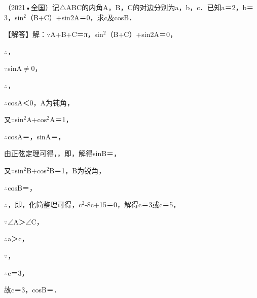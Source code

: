 \begin{question}
（2021•全国）记$\triangle$ABC的内角A，B，C的对边分别为a，b，c．已知a＝2\allowbreak{}，b＝3，sin$^{2}$（B+C）+\allowbreak{}sin2A＝0，求c及cosB．\par
\begin{solution}
【解答】解：$\because$A+B+C＝π，sin$^{2}$（B+C）+\allowbreak{}sin2A＝0，\par
$\therefore$\allowbreak{}，\par
$\because$sinA$\neq$0，\par
$\therefore$\allowbreak{}，\par
$\therefore$cosA＜0，A为钝角，\par
又$\because$sin$^{2}$A+cos$^{2}$A＝1，\par
$\therefore$cosA＝\allowbreak{}，sinA＝\allowbreak{}，\par
由正弦定理可得，\allowbreak{}，即\allowbreak{}，解得sinB＝\allowbreak{}，\par
又$\because$sin$^{2}$B+cos$^{2}$B＝1，B为锐角，\par
$\therefore$cosB＝\allowbreak{}，\par
$\therefore$\allowbreak{}，即\allowbreak{}，化简整理可得，c$^{2}$-8c+15＝0，解得c＝3或c＝5，\par
$\because$$\angle$A＞$\angle$C，\par
$\therefore$a＞c，\par
$\because$\allowbreak{}，\par
$\therefore$c＝3，\par
故c＝3，cosB＝\allowbreak{}．\par
\end{solution}
\end{question}

